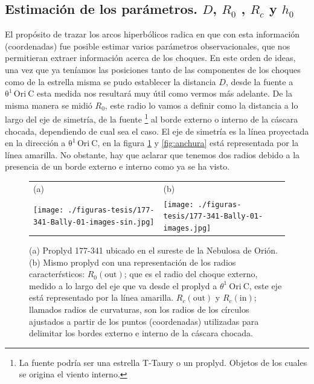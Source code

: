 \documentclass{article}
\newcommand\thC{\ensuremath{\mathrm{\theta^1\,Ori~C}}}
\newcommand\Out{\ensuremath{\mathrm{out}}}
\newcommand\In{\ensuremath{\mathrm{in}}}
\begin{document}
\subsection{Estimación de los parámetros. \(D\), \(R_{0}\) , \(R_{c}\) y \(h_{0}\) }
\label{sec:parametros}

El propósito de trazar los arcos hiperbólicos radica en  que con esta información (coordenadas) fue posible estimar varios parámetros observacionales, que nos permitieran extraer información acerca de los choques. En este orden de ideas, una vez que ya teníamos las posiciones tanto de las componentes de los choques como de la estrella misma se pudo establecer la distancia \(D\), desde la fuente a \thC{} esta medida nos resultará muy útil como vermos más adelante. De la misma manera se midió \(R_{0}\), este radio lo vamos a definir como la distancia a lo largo del eje de simetría, de la fuente \footnote{La fuente podría ser una estrella T-Taury o un proplyd. Objetos de los cuales se origina el viento interno.} \citep{Robberto:2005}  al borde externo o interno de la cáscara chocada, dependiendo de cual sea el caso. El eje de simetría es la línea proyectada en  la dirección a \thC{}, en la figura \ref{fig:radios} y \ref{fig:anchura} está representada por la línea amarilla. No obstante, hay que aclarar que tenemos dos radios debido a la presencia de un borde externo e interno como ya se ha visto. \\ 

\begin{figure}[htp]
\centering
\begin{tabular}{l l}
(a) & (b)  \\
  \texttt{[image: ./figuras-tesis/177-341-Bally-01-images-sin.jpg]}&
 \texttt{[image: ./figuras-tesis/177-341-Bally-01-images.jpg]}\\
\end{tabular}
\caption{(a) Proplyd 177-341 ubicado en el sureste de la Nebulosa de Orión. (b) Mismo proplyd con una representación de los radios caracterŕsticos: \(R_{0}(\Out{})\); que es el radio del choque externo, medido a lo largo del eje que va desde el proplyd a \(\theta^1\ \text{Ori}\ \text{C}\), este eje está representado por la línea amarilla. \(R_{c}(\Out{})\) y \(R_{c}(\In{})\); llamados radios de curvaturas, son los radios de los círculos ajustados a partir de los puntos (coordenadas) utilizadas para delimitar los bordes externo e interno de la cáscara chocada. }\label{fig:radios}
\end{figure}
\end{document}
